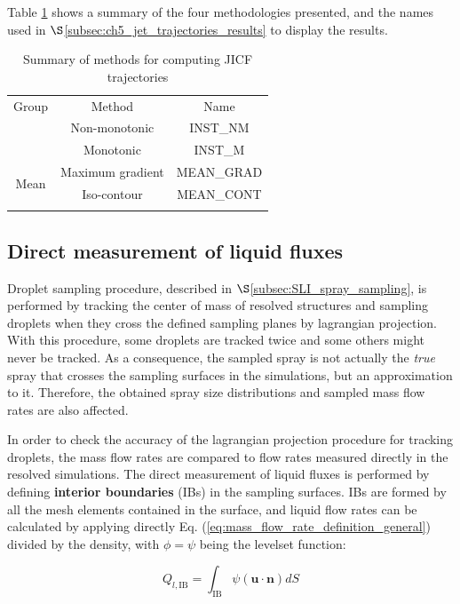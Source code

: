 Table \ref{tab:jicf_tools_trajectories_obtention} shows a summary of the four methodologies presented, and the names used in $\S$\ref{subsec:ch5_jet_trajectories_results} to display the results.

\begin{table}[!h]
\centering
\caption{Summary of methods for computing JICF trajectories}
\begin{tabular}{ccc}
\thickhline
Group & Method & Name \\
\thickhline
\multirow{2}{*}{Instantaneous} & Non-monotonic & INST\_NM \\
 & Monotonic & INST\_M \\
 \hline
\multirow{2}{*}{Mean} & Maximum gradient & MEAN\_GRAD \\
 & Iso-contour & MEAN\_CONT \\
\thickhline
\end{tabular}
\label{tab:jicf_tools_trajectories_obtention}
\end{table}

\subsection{Direct measurement of liquid fluxes}
\label{subsec:ch5_interior_boundaries}

Droplet sampling procedure, described in $\S$\ref{subsec:SLI_spray_sampling}, is performed by tracking the center of mass of resolved structures and sampling droplets when they cross the defined sampling planes by lagrangian projection. With this procedure, some droplets are tracked twice and some others might never be tracked. As a consequence, the sampled spray is not actually the \textsl{true} spray that crosses the sampling surfaces in the simulations, but an approximation to it. Therefore, the obtained spray size distributions and sampled mass flow rates are also affected.

In order to check the accuracy of the lagrangian projection procedure for tracking droplets, the mass flow rates are compared to flow rates measured directly in the resolved simulations. The direct measurement of liquid fluxes is performed by defining \textbf{interior boundaries} (IBs) in the sampling surfaces. IBs are formed by all the mesh elements contained in the surface, and liquid flow rates can be calculated by applying directly Eq. (\ref{eq:mass_flow_rate_definition_general}) divided by the density, with $\phi = \psi$ being the levelset function:

\begin{equation}
\label{eq:Q_lIB_general_definition}
Q_{l,\mathrm{IB}} = \int_{\mathrm{IB}} \psi \left( \textbf{u} \cdot \textbf{n} \right) dS
\end{equation}

